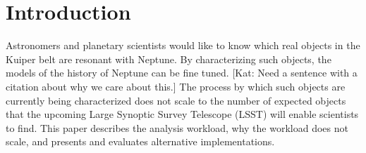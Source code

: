 \documentclass[conference]{IEEEtran}
\begin{document}
\IEEEpeerreviewmaketitle

%
%
%
%
%
%

\section{Introduction}

Astronomers and planetary scientists would like to know which real
objects in the Kuiper belt are resonant with Neptune.
By characterizing such objects, the models of the history of Neptune
can be fine tuned.  [Kat: Need a sentence with a citation
about why we care about this.] 
The process by which such objects are currently being characterized
does not scale to the number of expected objects that the
upcoming Large Synoptic Survey Telescope (LSST) will enable scientists to find.
This paper describes the analysis workload, why the workload does not
scale, and presents and evaluates alternative implementations.
\end{document}
